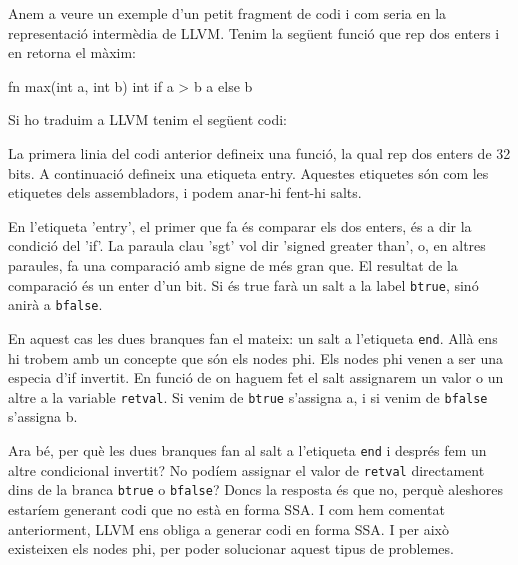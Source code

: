 ﻿\documentclass{article}
\begin{document}
Anem a veure un exemple d'un petit fragment de codi i com seria en la
representació intermèdia de LLVM. Tenim la següent funció  que rep dos enters i
en retorna el màxim:

\begin{code}
fn max(int a, int b) int {
    if a > b { a } else { b }
}
\end{code}

Si ho traduim a LLVM tenim el següent codi:


La primera linia del codi anterior defineix una funció, la qual rep dos enters
de 32 bits. A continuació defineix una etiqueta entry. Aquestes etiquetes són
com les etiquetes dels assembladors, i podem anar-hi fent-hi salts.

En l'etiqueta 'entry', el primer que fa és comparar els dos enters, és a dir la
condició del 'if'. La paraula clau 'sgt' vol dir 'signed greater than', o, en
altres paraules, fa una comparació amb signe de més gran que. El resultat de la
comparació és un enter d'un bit. Si és true farà un salt a la label
\texttt{btrue}, sinó anirà a \texttt{bfalse}. 

En aquest cas les dues branques fan el mateix: un salt a l'etiqueta
\texttt{end}. Allà ens hi trobem amb un concepte que són els nodes phi. Els 
nodes phi venen a ser una especia d'if invertit. En funció de on haguem fet el 
salt assignarem un valor o un altre a la variable \texttt{retval}. Si venim de
\texttt{btrue} s'assigna a, i si venim de \texttt{bfalse} s'assigna b.

Ara bé, per què les dues branques fan al salt a l'etiqueta \texttt{end} i
després fem un altre condicional invertit? No podíem assignar el valor de
\texttt{retval} directament dins de la branca \texttt{btrue} o \texttt{bfalse}?
Doncs la resposta és que no, perquè aleshores estaríem generant codi que no està
en forma SSA. I com hem comentat anteriorment, LLVM ens obliga a generar codi en
forma SSA. I per això existeixen els nodes phi, per poder solucionar aquest
tipus de problemes.
\end{document}

